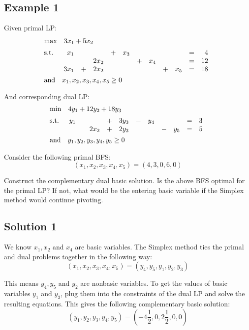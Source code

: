 \documentclass[12pt]{article}
\begin{document}
\subsection*{Example 1}
Given primal LP:
\begin{align*}
    &\mathrm{max} \quad 3x_1 + 5x_2  \\[2pt]
    &\mathrm{s.t.} \quad 
    \begin{array}[t]{r c r c r c r c r c r}
        x_1 & & & + & x_3 & & & & & = & 4 \\
        & & 2x_2 & & & + & x_4 & & & = & 12 \\
        3x_1 & + & 2x_2 & & & & & + & x_5 & = & 18
    \end{array}\\
    &\mathrm{and} \quad x_1, x_2, x_3, x_4, x_5 \geq 0
\end{align*}

\noindent
And corresponding dual LP:
\begin{align*}
    &\mathrm{min} \quad 4y_1 + 12y_2 + 18y_3  \\[2pt]
    &\mathrm{s.t.} \quad 
    \begin{array}[t]{r c r c r c r c r c r}
        y_1 & & & + & 3y_3 & - & y_4 & & & = & 3 \\
        & & 2x_2 & + & 2y_3 & & & - & y_5 & = & 5
    \end{array}\\
    &\mathrm{and} \quad y_1, y_2, y_3, y_4, y_5 \geq 0
\end{align*}

\noindent
Consider the following primal BFS:
\[ (x_1, x_2, x_3, x_4, x_5) = (4, 3, 0, 6, 0) \]

\noindent
Construct the complementary dual basic solution.
Is the above BFS optimal for the primal LP?
If not, what would be the entering basic variable if the Simplex method would continue pivoting. 

\subsection*{Solution 1}
We know $x_1, x_2$ and $x_4$ are basic variables.
The Simplex method ties the primal and dual problems together in the following way:
\[  (x_1, x_2, x_3, x_4, x_5) = (y_4, y_5, y_1, y_2, y_3) \]

\noindent
This means $y_4, y_5$ and $y_2$ are nonbasic variables.
To get the values of basic variables $y_1$ and $y_3$, plug them into the constraints of the dual LP and solve the resulting equations.
This gives the following complementary basic solution:
\[ (y_1, y_2, y_3, y_4, y_5) = (-4\frac{1}{2}, 0, 2\frac{1}{2}, 0, 0) \]
\end{document}
